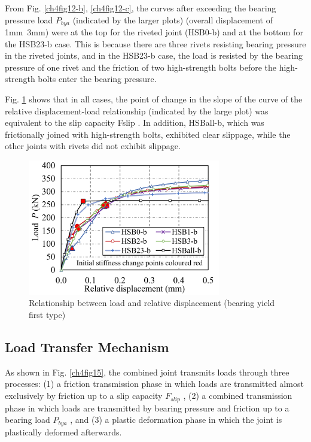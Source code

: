 From Fig. \ref{ch4fig12-b}, \ref{ch4fig12-c}, the curves after exceeding the bearing pressure load $P_{bya}$ (indicated by the larger plots) (overall displacement of 1mm~3mm) were at the top for the riveted joint (HSB0-b) and at the bottom for the HSB23-b case. This is because there are three rivets resisting bearing pressure in the riveted joints, and in the HSB23-b case, the load is resisted by the bearing pressure of one rivet and the friction of two high-strength bolts before the high-strength bolts enter the bearing pressure.

Fig. \ref{ch4fig14} shows that in all cases, the point of change in the slope of the curve of the relative displacement-load relationship (indicated by the large plot) was equivalent to the slip capacity Fslip . In addition, HSBall-b, which was frictionally joined with high-strength bolts, exhibited clear slippage, while the other joints with rivets did not exhibit slippage.

\begin{figure}[htbp]
    \centering
    \includegraphics[width=0.75\textwidth]{imgs/ch4/fig14.pdf}
    \caption{Relationship between load and relative displacement (bearing yield first type)}
    \label{ch4fig14}
\end{figure}

\subsection{Load Transfer Mechanism}

As shown in Fig. \ref{ch4fig15}, the combined joint transmits loads through three processes: (1) a friction transmission phase in which loads are transmitted almost exclusively by friction up to a slip capacity $F_{slip}$ , (2) a combined transmission phase in which loads are transmitted by bearing pressure and friction up to a bearing load $P_{bya}$ , and (3) a plastic deformation phase in which the joint is plastically deformed afterwards.

